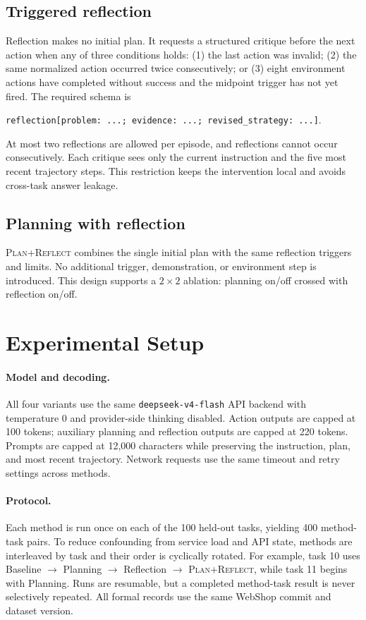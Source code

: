 \documentclass{article}
\newcommand{\method}[1]{\textsc{#1}}
\newcommand{\ours}{\method{Plan+Reflect}\xspace}
\begin{document}
\subsection{Triggered reflection}

Reflection makes no initial plan. It requests a structured critique before the next action when any of three conditions holds: (1) the last action was invalid; (2) the same normalized action occurred twice consecutively; or (3) eight environment actions have completed without success and the midpoint trigger has not yet fired. The required schema is
\begin{center}
{\small\texttt{reflection[problem: ...; evidence: ...; revised\_strategy: ...]}.\par}
\end{center}

\noindent At most two reflections are allowed per episode, and reflections cannot occur consecutively. Each critique sees only the current instruction and the five most recent trajectory steps. This restriction keeps the intervention local and avoids cross-task answer leakage.

\subsection{Planning with reflection}

\ours combines the single initial plan with the same reflection triggers and limits. No additional trigger, demonstration, or environment step is introduced. This design supports a $2\times2$ ablation: planning on/off crossed with reflection on/off.

\section{Experimental Setup}

\paragraph{Model and decoding.}
All four variants use the same \texttt{deepseek-v4-flash} API backend with temperature 0 and provider-side thinking disabled. Action outputs are capped at 100 tokens; auxiliary planning and reflection outputs are capped at 220 tokens. Prompts are capped at 12,000 characters while preserving the instruction, plan, and most recent trajectory. Network requests use the same timeout and retry settings across methods.

\paragraph{Protocol.}
Each method is run once on each of the 100 held-out tasks, yielding 400 method-task pairs. To reduce confounding from service load and API state, methods are interleaved by task and their order is cyclically rotated. For example, task 10 uses Baseline $\rightarrow$ Planning $\rightarrow$ Reflection $\rightarrow$ \ours, while task 11 begins with Planning. Runs are resumable, but a completed method-task result is never selectively repeated. All formal records use the same WebShop commit and dataset version.
\end{document}
